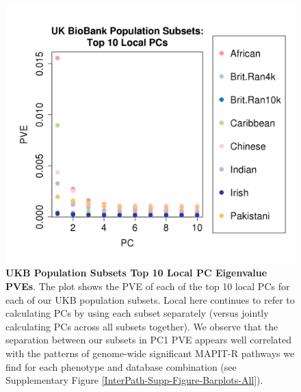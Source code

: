 \documentclass[12pt,a4paper]{article}
\begin{document}
\begin{figure}[htb]
\centering
\includegraphics[scale=.5]{Images/Main/InterPath_Main_Figure_Eigenvalues_vs1.png}
\caption[TBD]{\textbf{UKB Population Subsets Top 10 Local PC Eigenvalue PVEs}. The plot shows the PVE of each of the top 10 local PCs for each of our UKB population subsets. Local here continues to refer to calculating PCs by using each subset separately (versus jointly calculating PCs across all subsets together). We observe that the separation between our subsets in PC1 PVE appears well correlated with the patterns of genome-wide significant MAPIT-R pathways we find for each phenotype and database combination (see Supplementary Figure \ref{InterPath-Supp-Figure-Barplots-All}).}
\label{InterPath-Main-Figure-Eigenvalues}
\end{figure}
\end{document}

